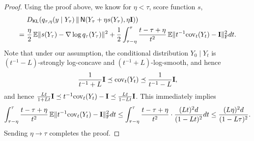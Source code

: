 \begin{proof}
Using the proof above, we know for $\eta<\tau$, score function $s$, 
\begin{align*}
    &~ \Dkl{q_{\tau,\eta}(y\mid Y_\tau)}{\normal{Y_\tau+\eta s(Y_\tau),\eta\Id}} \\
    =&~ \frac{\eta}{2}\En\nrm{ s(Y_\tau)-\nabla \log q_\tau(Y_\tau) }^2+\frac12\int_{\tau-\eta}^\tau \frac{t-\tau+\eta}{t^2} \En\nrmF{t^{-1}\cov_t(Y_t)-\Id}^2 dt.
\end{align*}
Note that under our assumption, the conditional distribution $Y_0\mid Y_t$ is $(t^{-1}-L)$-strongly log-concave and $(t^{-1}+L)$-log-smooth, and hence
\begin{align*}
    \frac{1}{t^{-1}+L}\mathbf{I}\preceq \mathrm{cov}_t(Y_t)\preceq \frac{1}{t^{-1}-L}\mathbf{I},
\end{align*}
and hence $\frac{Lt}{1+Lt}\mathbf{I}\preceq t^{-1}\mathrm{cov}_t(Y_t)-\mathbf{I}\preceq \frac{Lt}{1-Lt}\mathbf{I}$. This immediately implies
\begin{align*}
    \int_{\tau-\eta}^\tau \frac{t-\tau+\eta}{t^2} \operatorname{\mathbb{E}}\lVert t^{-1}\mathrm{cov}_t(Y_t)-\mathbf{I}\rVert_{\mathrm{F}}^2 dt
    \leq \int_{\tau-\eta}^\tau \frac{t-\tau+\eta}{t^2} \cdot \frac{(Lt)^2d}{(1-Lt)^2} dt \leq \frac{(L\eta)^2d}{(1-L\tau)^2}.
\end{align*}
Sending $\eta\to \tau$ completes the proof.
\end{proof}

